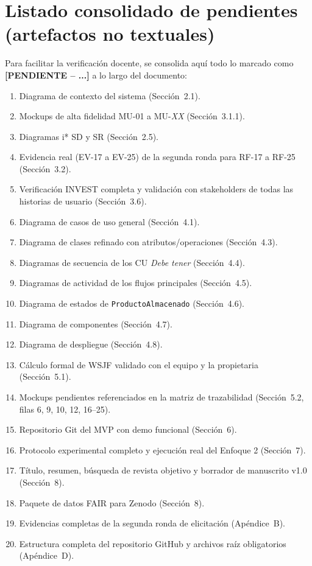 \documentclass[11pt,a4paper]{article}
\newcommand{\PENDIENTE}[1]{\textcolor{pendiente}{\textbf{[PENDIENTE -- #1]}}}
\begin{document}
\section{Listado consolidado de pendientes (artefactos no textuales)}
Para facilitar la verificación docente, se consolida aquí todo lo marcado como \PENDIENTE{...} a lo largo del documento:
\begin{enumerate}[nosep]
\item Diagrama de contexto del sistema (Sección~2.1).
\item Mockups de alta fidelidad MU-01 a MU-\textit{XX} (Sección~3.1.1).
\item Diagramas i* SD y SR (Sección~2.5).
\item Evidencia real (EV-17 a EV-25) de la segunda ronda para RF-17 a RF-25 (Sección~3.2).
\item Verificación INVEST completa y validación con stakeholders de todas las historias de usuario (Sección~3.6).
\item Diagrama de casos de uso general (Sección~4.1).
\item Diagrama de clases refinado con atributos/operaciones (Sección~4.3).
\item Diagramas de secuencia de los CU \textit{Debe tener} (Sección~4.4).
\item Diagramas de actividad de los flujos principales (Sección~4.5).
\item Diagrama de estados de \texttt{ProductoAlmacenado} (Sección~4.6).
\item Diagrama de componentes (Sección~4.7).
\item Diagrama de despliegue (Sección~4.8).
\item Cálculo formal de WSJF validado con el equipo y la propietaria (Sección~5.1).
\item Mockups pendientes referenciados en la matriz de trazabilidad (Sección~5.2, filas 6, 9, 10, 12, 16--25).
\item Repositorio Git del MVP con demo funcional (Sección~6).
\item Protocolo experimental completo y ejecución real del Enfoque 2 (Sección~7).
\item Título, resumen, búsqueda de revista objetivo y borrador de manuscrito v1.0 (Sección~8).
\item Paquete de datos FAIR para Zenodo (Sección~8).
\item Evidencias completas de la segunda ronda de elicitación (Apéndice~B).
\item Estructura completa del repositorio GitHub y archivos raíz obligatorios (Apéndice~D).
\end{enumerate}

\newpage


\end{document}
